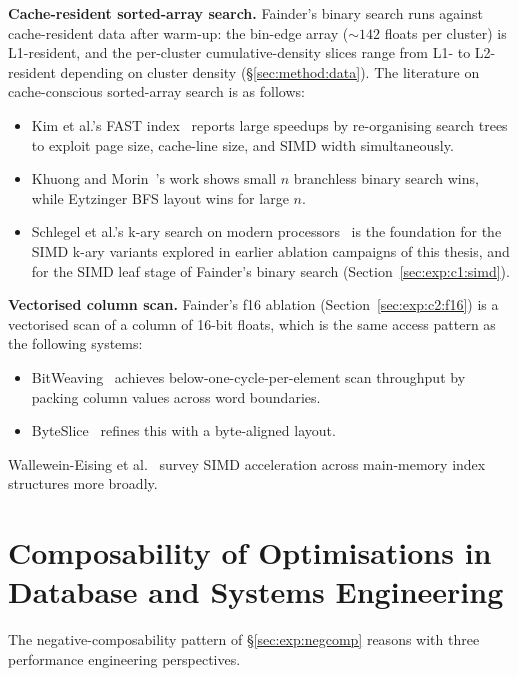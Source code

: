 \textbf{Cache-resident sorted-array search.} Fainder's binary search runs against cache-resident data after warm-up: the bin-edge array (${\sim}142$ floats per cluster) is L1-resident, and the per-cluster cumulative-density slices range from L1- to L2-resident depending on cluster density (§\ref{sec:method:data}). The literature on cache-conscious sorted-array search is as follows:

\begin{itemize}
    \item Kim et al.'s FAST index~\cite{kim_2010} reports large speedups by re-organising search trees to exploit page size, cache-line size, and SIMD width simultaneously.
    \item Khuong and Morin~\cite{khuong_morin_2017}'s work shows small $n$ branchless binary search wins, while Eytzinger BFS layout wins for large $n$.
    \item Schlegel et al.'s k-ary search on modern processors~\cite{schlegel_2009} is the foundation for the SIMD k-ary variants explored in earlier ablation campaigns of this thesis, and for the SIMD leaf stage of Fainder's binary search (Section~\ref{sec:exp:c1:simd}).
\end{itemize}

\textbf{Vectorised column scan.} Fainder's f16 ablation (Section~\ref{sec:exp:c2:f16}) is a vectorised scan of a column of 16-bit floats, which is the same access pattern as the following systems:
\begin{itemize}
    \item BitWeaving~\cite{li_patel_2013} achieves below-one-cycle-per-element scan throughput by packing column values across word boundaries.
    \item ByteSlice~\cite{feng_2015} refines this with a byte-aligned layout.
\end{itemize}

Wallewein-Eising et al.~\cite{wallewein_2018} survey SIMD acceleration across main-memory index structures more broadly.

\section{Composability of Optimisations in Database and Systems Engineering}

The negative-composability pattern of §\ref{sec:exp:negcomp} reasons with three performance engineering perspectives.

